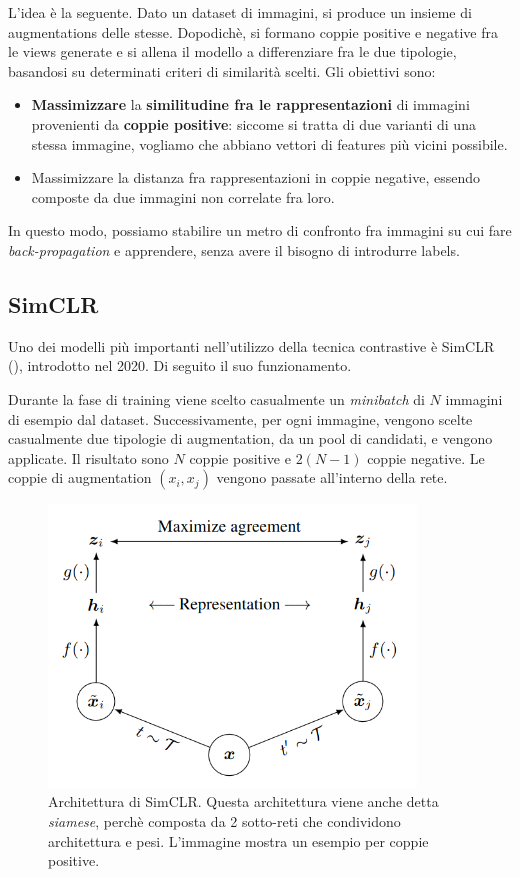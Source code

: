 L'idea è la seguente. Dato un dataset di immagini, si produce un insieme di augmentations delle stesse. Dopodichè, si formano coppie positive e negative fra le views generate e si allena il modello a differenziare fra le due tipologie, basandosi su determinati criteri di similarità scelti. Gli obiettivi sono:
\begin{itemize}
    \item \textbf{Massimizzare} la \textbf{similitudine fra le rappresentazioni} di immagini provenienti da \textbf{coppie positive}: siccome si tratta di due varianti di una stessa immagine, vogliamo che abbiano vettori di features più vicini possibile.
    \item Massimizzare la distanza fra rappresentazioni in coppie negative, essendo composte da due immagini non correlate fra loro.
\end{itemize}
In questo modo, possiamo stabilire un metro di confronto fra immagini su cui fare \textit{back-propagation} e apprendere, senza avere il bisogno di introdurre labels.

\subsection{SimCLR}
Uno dei modelli più importanti nell'utilizzo della tecnica contrastive è SimCLR (\cite{simclr}), introdotto nel 2020. Di seguito il suo funzionamento.

Durante la fase di training viene scelto casualmente un \textit{minibatch} di \(N\) immagini di esempio dal dataset. Successivamente, per ogni immagine, vengono scelte casualmente due tipologie di augmentation, da un pool di candidati, e vengono applicate. Il risultato sono \(N\) coppie positive e \(2(N-1)\) coppie negative. Le coppie di augmentation \((x_i, x_j)\) vengono passate all'interno della rete.

\begin{figure}[t]
    \centering
    \includegraphics[height=75mm]{Immagini/ssl/arch_simclr.png}
    \caption{Architettura di SimCLR. Questa architettura viene anche detta \textit{siamese}, perchè composta da 2 sotto-reti che condividono architettura e pesi. L'immagine mostra un esempio per coppie positive.}
    \label{fig:arch_simclr}
\end{figure}

